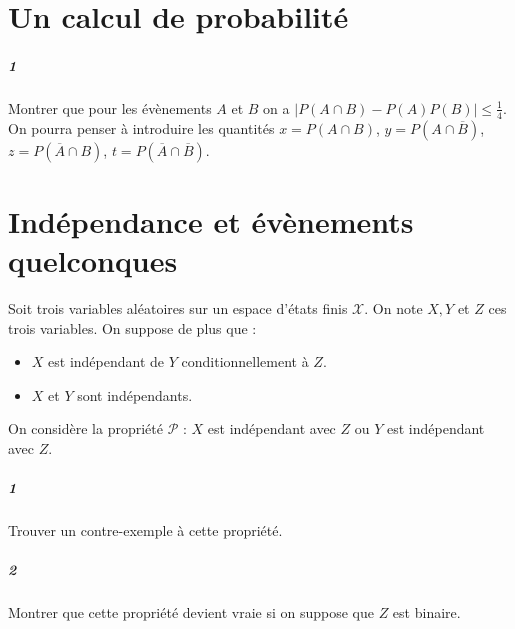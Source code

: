 \documentclass[10pt,a4paper]{article}
\begin{document}
\section{Un calcul de probabilité}
\subparagraph{1}Montrer que pour les évènements $A$ et $B$ on a $| P(A \cap B) - P(A)P(B) | \le \frac{1}{4}$. On pourra penser à introduire les quantités $x= P(A \cap B)$, $y= P(A \cap \overline{B})$, $z= P(\overline{A} \cap B)$, $t= P(\overline{A} \cap \overline{B})$.

\section{Indépendance et évènements quelconques}
Soit trois variables aléatoires sur un espace d'états finis $\mathcal{X}$. On note $X,Y$ et $Z$ ces trois variables. On suppose de plus que :
\begin{itemize}
\item $X$ est indépendant de $Y$ conditionnellement à $Z$.
\item $X$ et $Y$ sont indépendants.
\end{itemize}
On considère la propriété $\mathcal{P}$ : $X$ est indépendant avec $Z$ ou $Y$ est indépendant avec $Z$.
\subparagraph{1}Trouver un contre-exemple à cette propriété.
\subparagraph{2}Montrer que cette propriété devient vraie si on suppose que $Z$ est binaire.
\end{document}
